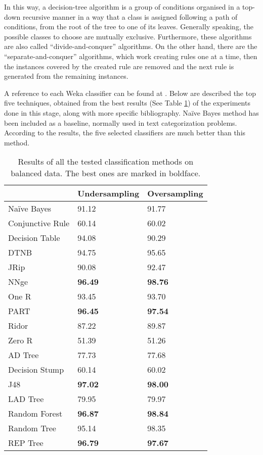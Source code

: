 \documentclass{llncs}
\begin{document}
In this way, a decision-tree algorithm is a group of conditions organised in a top-down recursive manner in a way that a class is assigned following a path of conditions, from the root of the tree to one of its leaves. Generally speaking, the possible classes to choose are mutually exclusive. Furthermore, these algorithms are also called ``divide-and-conquer'' algorithms. On the other hand, there are the ``separate-and-conquer'' algorithms, which work creating rules one at a time, then the instances covered by the created rule are removed and the next rule is generated from the remaining instances.

A reference to each Weka classifier can be found at \cite{Frank2011}. Below are described the top five techniques, obtained from the best results (See Table \ref{tabresults_todos}) of the experiments done in this stage, along with more specific bibliography. Naïve Bayes method \cite{Bayesian_Classifier_97} has been included as a baseline, normally used in text categorization problems. According to the results, the five selected classifiers are much better than this method.

\begin{table}[htpb]
\centering
 \caption{\label{tabresults_todos} Results of all the tested classification methods on balanced data. The best ones are marked in boldface.}
{\small
\begin{tabular}{|l|l|l|}
\cline{2-3}
\multicolumn{1}{l|}{} & Undersampling & Oversampling \\ 
\hline
Naïve Bayes & 91.12 & 91.77 \\ 
\hline
Conjunctive Rule & 60.14 & 60.02 \\ 
\cline{1-1}
Decision Table & 94.08 & 90.29 \\ 
\cline{1-1}
DTNB & 94.75 & 95.65 \\ 
\cline{1-1}
JRip & 90.08 & 92.47 \\ 
\cline{1-1}
NNge & \textbf{96.49} & \textbf{98.76} \\ 
\cline{1-1}
One R & 93.45 & 93.70 \\ 
\cline{1-1}
PART & \textbf{96.45} & \textbf{97.54} \\ 
\cline{1-1}
Ridor & 87.22 & 89.87 \\ 
\cline{1-1}
Zero R & 51.39 & 51.26 \\ 
\cline{1-1}
AD Tree & 77.73 & 77.68 \\ 
\cline{1-1}
Decision Stump & 60.14 & 60.02 \\ 
\cline{1-1}
J48 & \textbf{97.02} & \textbf{98.00} \\ 
\cline{1-1}
LAD Tree & 79.95 & 79.97 \\ 
\cline{1-1}
Random Forest & \textbf{96.87} & \textbf{98.84} \\ 
\cline{1-1}
Random Tree & 95.14 & 98.35 \\ 
\cline{1-1}
REP Tree & \textbf{96.79} & \textbf{97.67} \\ 
\hline
\end{tabular}
}
\end{table}
\end{document}
